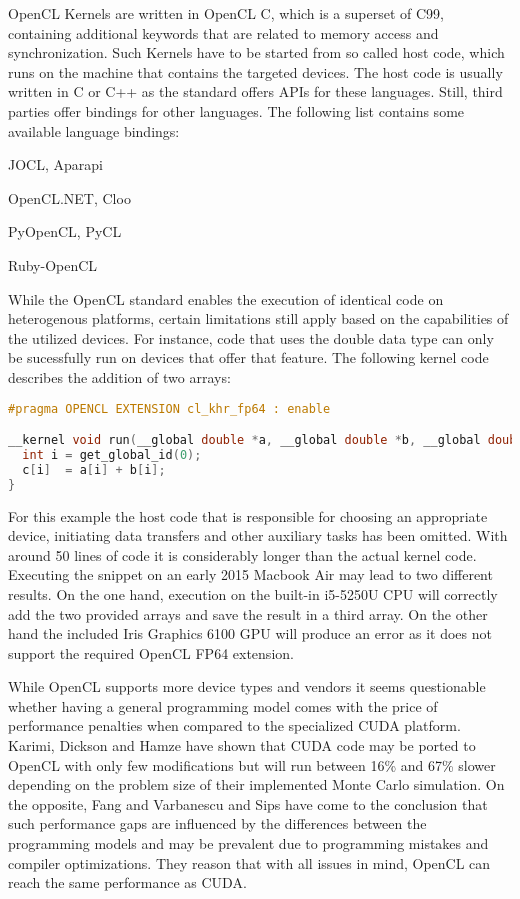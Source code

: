 OpenCL Kernels are written in OpenCL C, which is a superset of C99, containing additional keywords that are related to memory access and synchronization. Such Kernels have to be started from so called host code, which runs on the machine that contains the targeted devices. The host code is usually written in C or C++ as the standard offers APIs for these languages. Still, third parties offer bindings for other languages. The following list contains some available language bindings:

\begin{description}[align=left]
  \item [Java] JOCL, Aparapi
  \item [.NET] OpenCL.NET, Cloo
  \item [Python] PyOpenCL, PyCL
  \item [Ruby] Ruby-OpenCL
\end{description}

While the OpenCL standard enables the execution of identical code on heterogenous platforms, certain limitations still apply based on the capabilities of the utilized devices. For instance, code that uses the double data type can only be sucessfully run on devices that offer that feature. The following kernel code describes the addition of two arrays:

\begin{lstlisting}[language=C++]
#pragma OPENCL EXTENSION cl_khr_fp64 : enable

__kernel void run(__global double *a, __global double *b, __global double *c){
  int i = get_global_id(0);
  c[i]  = a[i] + b[i];
}
\end{lstlisting}

For this example the host code that is responsible for choosing an appropriate device, initiating data transfers and other auxiliary tasks has been omitted. With around 50 lines of code it is considerably longer than the actual kernel code. Executing the snippet on an early 2015 Macbook Air may lead to two different results. On the one hand, execution on the built-in i5-5250U CPU will correctly add the two provided arrays and save the result in a third array. On the other hand the included Iris Graphics 6100 GPU will produce an error as it does not support the required OpenCL FP64 extension.

While OpenCL supports more device types and vendors it seems questionable whether having a general programming model comes with the price of performance penalties when compared to the specialized CUDA platform. Karimi, Dickson and Hamze have shown that CUDA code may be ported to OpenCL with only few modifications but will run between 16\% and 67\% slower depending on the problem size of their implemented Monte Carlo simulation\cite{performance_comparison}. On the opposite, Fang and Varbanescu and Sips have come to the conclusion that such performance gaps are influenced by the differences between the programming models and may be prevalent due to programming mistakes and compiler optimizations\cite{comprehensive_performance_comparison}. They reason that with all issues in mind, OpenCL can reach the same performance as CUDA.

